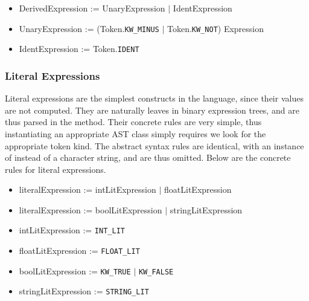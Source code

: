 \begin{itemize}
	\item DerivedExpression := UnaryExpression $|$ IdentExpression
	\item UnaryExpression := (Token.\texttt{KW\_MINUS} $|$ Token.\texttt{KW\_NOT}) Expression
	\item IdentExpression := Token.\texttt{IDENT}
\end{itemize}

\subsubsection{Literal Expressions}

Literal expressions are the simplest constructs in the language, since their values are not computed. They are naturally leaves in binary expression trees, and are thus parsed in the  method. Their concrete rules are very simple, thus instantiating an appropriate AST class simply requires we look for the appropriate token kind. The abstract syntax rules are identical, with an instance of  instead of a character string, and are thus omitted. Below are the concrete rules for literal expressions.

\begin{itemize}
	\item literalExpression := intLitExpression $|$ floatLitExpression
	\item literalExpression := boolLitExpression $|$ stringLitExpression
	\item intLitExpression := \texttt{INT\_LIT}
	\item floatLitExpression := \texttt{FLOAT\_LIT}
	\item boolLitExpression := \texttt{KW\_TRUE} $|$ \texttt{KW\_FALSE}
	\item stringLitExpression := \texttt{STRING\_LIT}
\end{itemize}

